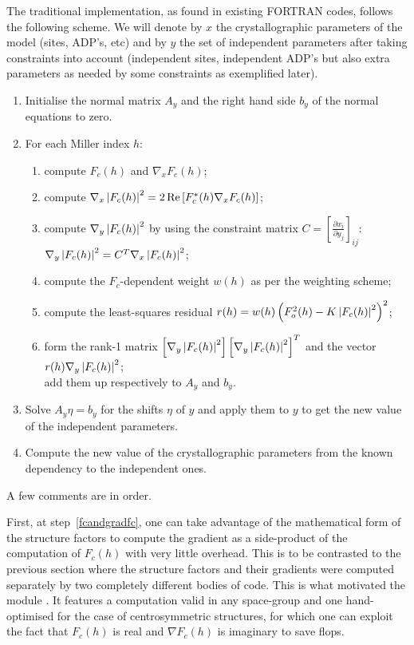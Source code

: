 \documentclass[12pt]{article}
\begin{document}
 The traditional implementation, as found in existing FORTRAN codes, follows the following scheme. We will denote by $x$ the crystallographic parameters of the model (sites, ADP's, etc) and by $y$ the set of independent parameters after taking constraints into account (independent sites, independent ADP's but also extra parameters as needed by some constraints as exemplified later).
 \begin{enumerate}
 \item Initialise the normal matrix $A_y$ and the right hand side $b_y$ of the normal equations to zero.
\item For each Miller index $h$: \label{bignormalmatrixloop}
\begin{enumerate}
\item compute $F_c(h)$ and $\nabla_x F_c(h)$;\label{fcandgradfc}
\item compute $\nabla_x \left| F_c(h) \right|^2 = 2\operatorname{Re}\left[F_c^*(h) \nabla_x F_c(h)\right]$;
\item compute $\nabla_y \left| F_c(h) \right|^2$ by using the constraint matrix $C=\left[\frac{\partial x_i}{\partial y_j}\right]_{ij}$: \\
$\nabla_y \left| F_c(h) \right|^2 = C^T \nabla_x \left| F_c(h) \right|^2$;
\item compute the $F_c$-dependent weight $w(h)$ as per the weighting scheme;
\item compute the least-squares residual $r(h) = w(h)\left(F_o^2(h) - K \left| F_c(h) \right|^2\right)^2$;
\item form the rank-1 matrix $\left[\nabla_y \left| F_c(h) \right|^2\right] \left[\nabla_y \left| F_c(h) \right|^2\right]^T$ and the vector $r(h) \nabla_y \left| F_c(h) \right|^2$;
\\ add them up respectively to $A_y$ and $b_y$.
\end{enumerate}
\item Solve $A_y \eta = b_y$ for the shifts $\eta$ of $y$ and apply them to $y$ to get the new value of the independent parameters.
\item Compute the new value of the crystallographic parameters from the known dependency to the independent ones.
\label{constrainedshifts}
\end{enumerate}
A few comments are in order. 

First, at step~\ref{fcandgradfc}, one can take advantage of the mathematical form of the structure factors to compute the gradient as a side-product of the computation of $F_c(h)$ with very little overhead. This is to be contrasted to the previous section where the structure factors and their gradients were computed separately by two completely different bodies of code. This is what motivated the module . It features a computation valid in any space-group and one hand-optimised for the case of centrosymmetric structures, for which one can exploit the fact that $F_c(h)$ is real and $\nabla F_c(h)$ is imaginary to save flops.
\end{document}
